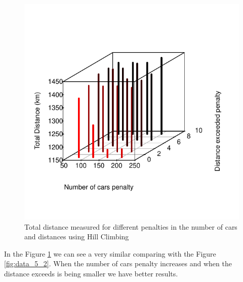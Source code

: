 \documentclass[12]{article}
\begin{document}
\begin{figure}[H]
  \captionsetup{justification=centering}
   \centering
    \includegraphics[scale=0.8]{Results/data_5_3.pdf}
      \caption{Total distance measured for different penalties in the number of cars and distances using Hill Climbing}
      \label{fig:data_5_3}
  \end{figure}
    \vspace{1cm}

In the Figure \ref{fig:data_5_3} we can see a very similar comparing with the Figure \ref{fig:data_5_2}. When the number of cars penalty increases and when the distance exceeds is being smaller we have better results.
\end{document}
